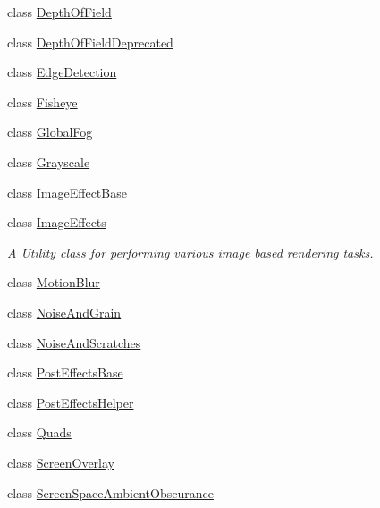 \begin{DoxyCompactItemize}
\item 
class \hyperlink{class_unity_standard_assets_1_1_image_effects_1_1_depth_of_field}{Depth\+Of\+Field}
\item 
class \hyperlink{class_unity_standard_assets_1_1_image_effects_1_1_depth_of_field_deprecated}{Depth\+Of\+Field\+Deprecated}
\item 
class \hyperlink{class_unity_standard_assets_1_1_image_effects_1_1_edge_detection}{Edge\+Detection}
\item 
class \hyperlink{class_unity_standard_assets_1_1_image_effects_1_1_fisheye}{Fisheye}
\item 
class \hyperlink{class_unity_standard_assets_1_1_image_effects_1_1_global_fog}{Global\+Fog}
\item 
class \hyperlink{class_unity_standard_assets_1_1_image_effects_1_1_grayscale}{Grayscale}
\item 
class \hyperlink{class_unity_standard_assets_1_1_image_effects_1_1_image_effect_base}{Image\+Effect\+Base}
\item 
class \hyperlink{class_unity_standard_assets_1_1_image_effects_1_1_image_effects}{Image\+Effects}
\begin{DoxyCompactList}\small\item\em A Utility class for performing various image based rendering tasks. \end{DoxyCompactList}\item 
class \hyperlink{class_unity_standard_assets_1_1_image_effects_1_1_motion_blur}{Motion\+Blur}
\item 
class \hyperlink{class_unity_standard_assets_1_1_image_effects_1_1_noise_and_grain}{Noise\+And\+Grain}
\item 
class \hyperlink{class_unity_standard_assets_1_1_image_effects_1_1_noise_and_scratches}{Noise\+And\+Scratches}
\item 
class \hyperlink{class_unity_standard_assets_1_1_image_effects_1_1_post_effects_base}{Post\+Effects\+Base}
\item 
class \hyperlink{class_unity_standard_assets_1_1_image_effects_1_1_post_effects_helper}{Post\+Effects\+Helper}
\item 
class \hyperlink{class_unity_standard_assets_1_1_image_effects_1_1_quads}{Quads}
\item 
class \hyperlink{class_unity_standard_assets_1_1_image_effects_1_1_screen_overlay}{Screen\+Overlay}
\item 
class \hyperlink{class_unity_standard_assets_1_1_image_effects_1_1_screen_space_ambient_obscurance}{Screen\+Space\+Ambient\+Obscurance}

\end{DoxyCompactItemize}
